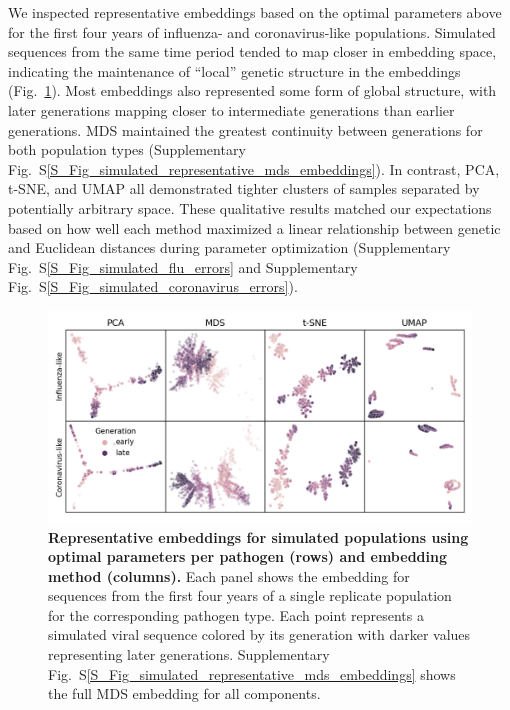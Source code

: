 \documentclass[webpdf,contemporary,large,single]{oup-authoring-template}%
\theoremstyle{thmstyleone}%
\theoremstyle{thmstyletwo}%
\theoremstyle{thmstylethree}%
\begin{document}
We inspected representative embeddings based on the optimal parameters above for the first four years of influenza- and coronavirus-like populations.
Simulated sequences from the same time period tended to map closer in embedding space, indicating the maintenance of ``local'' genetic structure in the embeddings (Fig.~\ref{fig:simulated-populations-representative-embeddings}).
Most embeddings also represented some form of global structure, with later generations mapping closer to intermediate generations than earlier generations.
MDS maintained the greatest continuity between generations for both population types (Supplementary Fig.~S\ref{S_Fig_simulated_representative_mds_embeddings}).
In contrast, PCA, t-SNE, and UMAP all demonstrated tighter clusters of samples separated by potentially arbitrary space.
These qualitative results matched our expectations based on how well each method maximized a linear relationship between genetic and Euclidean distances during parameter optimization (Supplementary Fig.~S\ref{S_Fig_simulated_flu_errors} and Supplementary Fig.~S\ref{S_Fig_simulated_coronavirus_errors}).

\begin{figure}[!h]
\includegraphics[width=\columnwidth]{figures/simulated-populations-representative-embeddings.png}
\caption{{\bf Representative embeddings for simulated populations using optimal parameters per pathogen (rows) and embedding method (columns).}
  Each panel shows the embedding for sequences from the first four years of a single replicate population for the corresponding pathogen type.
  Each point represents a simulated viral sequence colored by its generation with darker values representing later generations.
  Supplementary Fig.~S\ref{S_Fig_simulated_representative_mds_embeddings} shows the full MDS embedding for all components.}
\label{fig:simulated-populations-representative-embeddings}
\end{figure}
\end{document}
